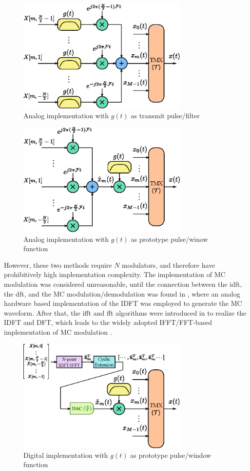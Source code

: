 \documentclass[journal]{IEEEtran}
\begin{document}
\begin{figure}
  \centering
  \includegraphics[width=8.5cm]{adi11}
  \caption{Analog implementation with $g(t)$ as transmit pulse/filter}
  \label{adi1}
\end{figure}

\begin{figure}
  \centering
  \includegraphics[width=8.5cm]{adi2n}
  \caption{Analog implementation with $g(t)$ as prototype pulse/winow function}
  \label{adi2}
\end{figure}

However, these two methods require $N$ modulators, and therefore have prohibitively high implementation complexity. The implementation of MC modulation was considered unreasonable, until the connection between the \ac{idft}, the \ac{dft}, and the MC modulation/demodulation was found in \cite{zimmerman_kathryn_1967}, where an analog hardware based implementation of the IDFT was employed to generate the MC waveform.
After that, the \ac{ifft} and \ac{fft} algorithms \cite{fft} were introduced in \cite{salz1969} to realize the IDFT and DFT, which leads to the widely adopted IFFT/FFT-based implementation of MC modulation \cite{ofdm_dft_weinstein_71}.
 

\begin{figure}[t]
  \centering
  \includegraphics[width=8.5cm]{adi2n_ifft1}
  \caption{Digital implementation with $g(t)$ as prototype pulse/window function}
  \label{adi2n_ifft1}
\end{figure}
\end{document}
